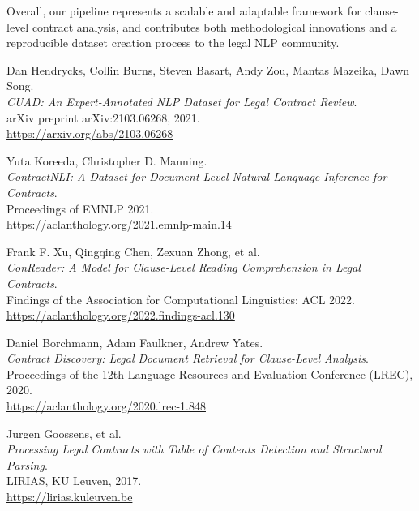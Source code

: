 \documentclass[11pt, oneside]{article}   	%
\begin{document}
Overall, our pipeline represents a scalable and adaptable framework for clause-level contract analysis, and contributes both methodological innovations and a reproducible dataset creation process to the legal NLP community.
\begin{thebibliography}{9}

	Dan Hendrycks, Collin Burns, Steven Basart, Andy Zou, Mantas Mazeika, Dawn Song.\\
	\textit{CUAD: An Expert-Annotated NLP Dataset for Legal Contract Review}.\\
	arXiv preprint arXiv:2103.06268, 2021.\\
	\href{https://arxiv.org/abs/2103.06268}{https://arxiv.org/abs/2103.06268}
	
	Yuta Koreeda, Christopher D. Manning.\\
	\textit{ContractNLI: A Dataset for Document-Level Natural Language Inference for Contracts}.\\
	Proceedings of EMNLP 2021.\\
	\href{https://aclanthology.org/2021.emnlp-main.14}{https://aclanthology.org/2021.emnlp-main.14}
	
	Frank F. Xu, Qingqing Chen, Zexuan Zhong, et al.\\
	\textit{ConReader: A Model for Clause-Level Reading Comprehension in Legal Contracts}.\\
	Findings of the Association for Computational Linguistics: ACL 2022.\\
	\href{https://aclanthology.org/2022.findings-acl.130}{https://aclanthology.org/2022.findings-acl.130}
	
	Daniel Borchmann, Adam Faulkner, Andrew Yates.\\
	\textit{Contract Discovery: Legal Document Retrieval for Clause-Level Analysis}.\\
	Proceedings of the 12th Language Resources and Evaluation Conference (LREC), 2020.\\
	\href{https://aclanthology.org/2020.lrec-1.848}{https://aclanthology.org/2020.lrec-1.848}
	
	Jurgen Goossens, et al.\\
	\textit{Processing Legal Contracts with Table of Contents Detection and Structural Parsing}.\\
	LIRIAS, KU Leuven, 2017.\\
	\href{https://lirias.kuleuven.be}{https://lirias.kuleuven.be}
	

\end{thebibliography}
\end{document}

